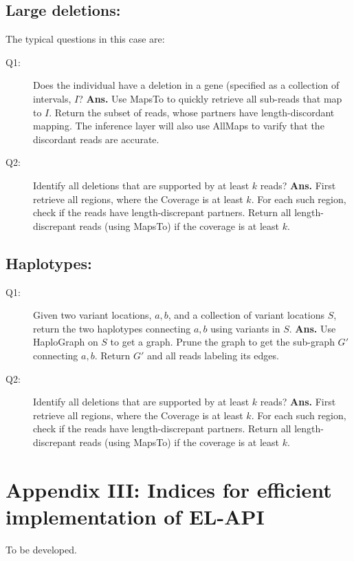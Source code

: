 \documentclass[11pt]{article}
\begin{document}
\begin{enumerate}
\subsection{Large deletions:}
The typical questions in this case are:
\begin{description}
\item [Q1:] Does the individual have a deletion in a gene (specified
  as a collection of intervals, $I$? {\bf Ans.} Use {\sc MapsTo} to
  quickly retrieve all sub-reads that map to $I$. Return the subset of
  reads, whose partners have length-discordant mapping. The inference
  layer will also use {\sc AllMaps} to varify that the discordant
  reads are accurate.
\item [Q2:] Identify all deletions that are supported by at least $k$
  reads? {\bf Ans.} First retrieve all regions, where the {\sc
    Coverage} is at least $k$. For each such region, check if the
  reads have length-discrepant partners. Return all length-discrepant
  reads (using {\sc MapsTo}) if the coverage is at least $k$.
\end{description}

\subsection{Haplotypes:}
\begin{description}
\item [Q1:] Given two variant locations, $a,b$, and a collection of
  variant locations $S$, return the two haplotypes connecting $a,b$
  using variants in $S$. {\bf Ans.} Use {\sc HaploGraph} on $S$ to get
  a graph. Prune the graph to get the sub-graph $G'$ connecting
  $a,b$. Return $G'$ and all reads labeling its edges.

\item [Q2:] Identify all deletions that are supported by at least $k$
  reads? {\bf Ans.} First retrieve all regions, where the {\sc
    Coverage} is at least $k$. For each such region, check if the
  reads have length-discrepant partners. Return all length-discrepant
  reads (using {\sc MapsTo}) if the coverage is at least $k$.
\end{description}
\newpage

\section{Appendix III: Indices for efficient implementation of EL-API}

To be developed.

\end{enumerate}
\end{document}
